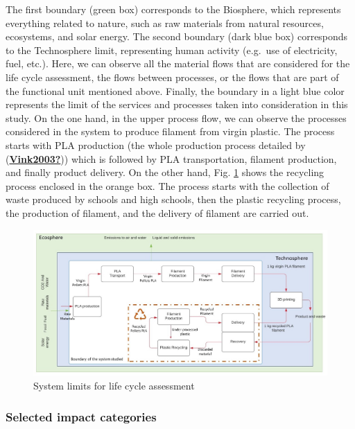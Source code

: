 \documentclass[12pt]{elsarticle} %
\begin{document}
The first boundary (green box) corresponds to the Biosphere, which represents everything related to nature, such as raw materials from natural resources, ecosystems, and solar energy.
The second boundary (dark blue box) corresponds to the Technosphere limit, representing human activity (e.g.~use of electricity, fuel, etc.). Here, we can observe all the material flows that are considered for the life cycle assessment, the flows between processes, or the flows that are part of the functional unit mentioned above.
Finally, the boundary in a light blue color represents the limit of the services and processes taken into consideration in this study. On the one hand, in the upper process flow, we can observe the processes considered in the system to produce filament from virgin plastic.
The process starts with PLA production (the whole production process detailed by (\protect\hyperlink{ref-Vink2003}{\textbf{Vink2003?}}))
which is followed by PLA transportation, filament production, and finally product delivery.
On the other hand, Fig. \ref{fig:figure1} shows the recycling process enclosed in the orange box. The process starts with the collection of waste produced by schools and high schools, then the plastic recycling process, the production of filament, and the delivery of filament are carried out.

\begin{figure}[H]

{\centering \includegraphics[width=1\linewidth,]{Figures/Figure-1} 

}

\caption{System limits for life cycle assessment}\label{fig:figure1}
\end{figure}

\hypertarget{impactcat}{%
\subsubsection{Selected impact categories}\label{impactcat}}
\end{document}
